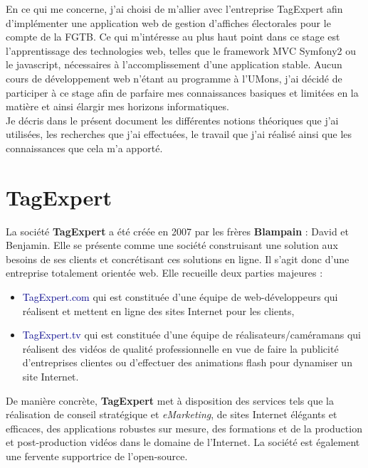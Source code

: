 \documentclass{article}
\newcommand{\blu}[1]{\textcolor{darkblue}{#1}}
\begin{document}
\begin{sffamily}
En ce qui me concerne, j'ai choisi de m'allier avec l'entreprise TagExpert afin d'implémenter une application web de gestion d'affiches électorales pour le compte de la 
FGTB. Ce qui m'intéresse au plus haut point dans ce stage est l'apprentissage des technologies web, telles que le framework MVC Symfony2 ou le javascript, nécessaires à 
l'accomplissement d'une application stable. Aucun cours de développement web n'étant au programme à l'UMons, j'ai décidé de participer à ce stage afin de parfaire mes
connaissances basiques et limitées en la matière et ainsi élargir mes horizons informatiques. \\


Je décris dans le présent document les différentes notions théoriques que j’ai utilisées, les recherches que j'ai effectuées, le travail que j’ai réalisé ainsi que les 
connaissances que cela m'a apporté.


\section{TagExpert}

La société \textbf{TagExpert} a été créée en 2007 par les frères \textbf{Blampain} : David et Benjamin. Elle se présente comme une société construisant 
une solution aux besoins de ses clients et concrétisant ces solutions en ligne. Il s'agit donc d'une entreprise totalement orientée web. Elle recueille deux parties majeures 
: 
\begin{itemize}
\item \blu{TagExpert.com} qui est constituée d'une équipe de web-développeurs qui réalisent et mettent en ligne des sites Internet pour les clients,
\item \blu{TagExpert.tv} qui est constituée d'une équipe de réalisateurs/caméramans qui réalisent des vidéos de qualité professionnelle en vue de faire la publicité 
d'entreprises clientes ou d'effectuer des animations flash pour dynamiser un site Internet.
\end{itemize}

De manière concrète, \textbf{TagExpert} met à disposition des services tels que la réalisation de conseil stratégique et \textit{eMarketing}, de sites Internet élégants et 
efficaces, des applications robustes sur mesure, des formations et de la production et post-production vidéos dans le domaine de l'Internet. La société est également une 
fervente supportrice de l'open-source.


\end{sffamily}
\end{document}
